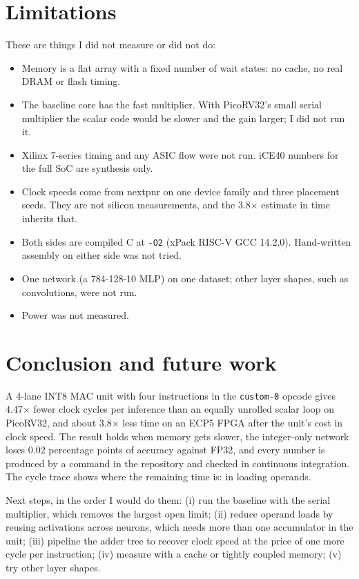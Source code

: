 \documentclass[10pt,a4paper]{article}
\begin{document}
\section{Limitations}
These are things I did not measure or did not do:
\begin{itemize}
\item Memory is a flat array with a fixed number of wait states: no cache, no real DRAM or flash timing.
\item The baseline core has the fast multiplier. With PicoRV32's small serial multiplier the scalar code would be slower and the gain larger; I did not run it.
\item Xilinx 7-series timing and any ASIC flow were not run. iCE40 numbers for the full SoC are synthesis only.
\item Clock speeds come from nextpnr on one device family and three placement seeds. They are not silicon measurements, and the 3.8$\times$ estimate in time inherits that.
\item Both sides are compiled C at \texttt{-O2} (xPack RISC-V GCC 14.2.0). Hand-written assembly on either side was not tried.
\item One network (a 784-128-10 MLP) on one dataset; other layer shapes, such as convolutions, were not run.
\item Power was not measured.
\end{itemize}

\section{Conclusion and future work}
A 4-lane INT8 MAC unit with four instructions in the \texttt{custom-0} opcode gives 4.47$\times$ fewer clock cycles per inference than an equally unrolled scalar loop on PicoRV32, and about 3.8$\times$ less time on an ECP5 FPGA after the unit's cost in clock speed. The result holds when memory gets slower, the integer-only network loses 0.02 percentage points of accuracy against FP32, and every number is produced by a command in the repository and checked in continuous integration. The cycle trace shows where the remaining time is: in loading operands.

Next steps, in the order I would do them: (i) run the baseline with the serial multiplier, which removes the largest open limit; (ii) reduce operand loads by reusing activations across neurons, which needs more than one accumulator in the unit; (iii) pipeline the adder tree to recover clock speed at the price of one more cycle per instruction; (iv) measure with a cache or tightly coupled memory; (v) try other layer shapes.
\end{document}
